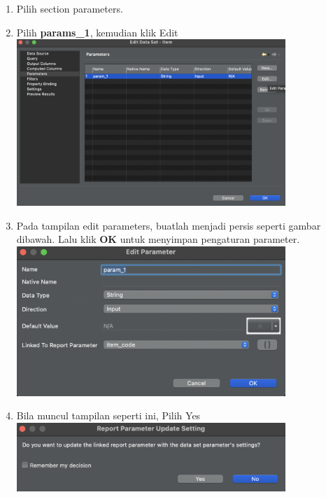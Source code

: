 \begin{enumerate}
	\item Pilih section parameters. 
	
	\item Pilih \textbf{params\_1}, kemudian klik Edit \\
	\includegraphics[width=0.8\textwidth]{assets/pertemuan14/Parameters/birt-edit-data-set-edit-parameters.png}
	
	\item Pada tampilan edit parameters, buatlah menjadi persis seperti gambar dibawah. Lalu klik \textbf{OK} untuk menyimpan pengaturan parameter. \\
	\includegraphics[width=0.8\textwidth]{assets/pertemuan14/Parameters/birt-edit-parameter.png}
	
	\item Bila muncul tampilan seperti ini, Pilih Yes \\
	\includegraphics[width=0.8\textwidth]{assets/pertemuan14/Parameters/birt-report-parameter-update-settings.png}
	
\end{enumerate}

